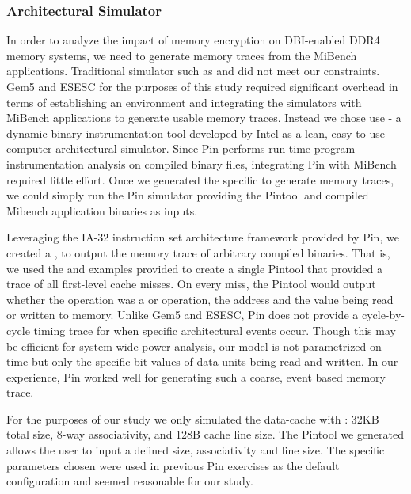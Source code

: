 \subsubsection{Architectural Simulator}
In order to analyze the impact of memory encryption on DBI-enabled DDR4 memory
systems, we need to generate memory traces from the MiBench applications.
Traditional simulator such as  \cite{gem5} and  \cite{esesc}
did not meet our constraints. Gem5 and ESESC for the purposes of this study
required significant overhead in terms of establishing an environment and
integrating the simulators with MiBench applications to generate usable memory
traces. Instead we chose use  \cite{pin} - a dynamic binary
instrumentation tool developed by Intel as a lean, easy to use computer
architectural simulator. Since Pin performs run-time program instrumentation
analysis on compiled binary files, integrating Pin with MiBench required little
effort. Once we generated the specific  to generate memory traces,
we could simply run the Pin simulator providing the Pintool and compiled
Mibench application binaries as inputs.

Leveraging the IA-32 instruction set architecture framework provided by Pin, we
created a , to output the memory trace of arbitrary compiled
binaries. That is, we used the  and  examples provided
to create a single Pintool that provided a trace of all first-level cache
misses. On every miss, the Pintool would output whether the operation was a
 or  operation, the address and the value being read or
written to memory. Unlike Gem5 and ESESC, Pin does not provide a cycle-by-cycle
timing trace for when specific architectural events occur. Though this may be
efficient for system-wide power analysis, our model is not parametrized on time
but only the specific bit values of data units being read and written. In our
experience, Pin worked well for generating such a coarse, event based memory
trace.

For the purposes of our study we only simulated the data-cache with : 32KB
total size, 8-way associativity, and 128B cache line size. The Pintool we
generated allows the user to input a defined size, associativity and line size.
The specific parameters chosen were used in previous Pin exercises as the
default configuration and seemed reasonable for our study.

